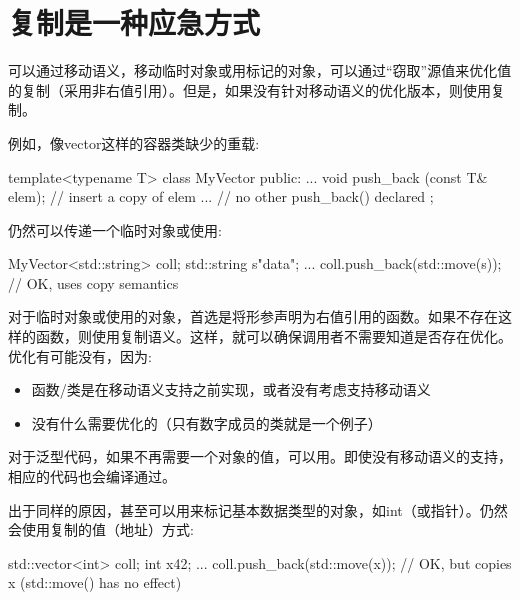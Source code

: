 \section{复制是一种应急方式}
可以通过移动语义，移动临时对象或用标记的对象，可以通过“窃取”源值来优化值的复制（采用非右值引用）。但是，如果没有针对移动语义的优化版本，则使用复制。

例如，像vector这样的容器类缺少的重载:

\begin{cppcode}
template<typename T>
class MyVector {
	public:
	...
	void push_back (const T& elem); // insert a copy of elem
	... // no other push_back() declared
};
\end{cppcode}

仍然可以传递一个临时对象或使用:

\begin{cppcode}
MyVector<std::string> coll;
std::string s{"data"};
...
coll.push_back(std::move(s)); // OK, uses copy semantics
\end{cppcode}

对于临时对象或使用的对象，首选是将形参声明为右值引用的函数。如果不存在这样的函数，则使用复制语义。这样，就可以确保调用者不需要知道是否存在优化。优化有可能没有，因为:


\begin{itemize}
	\item 函数/类是在移动语义支持之前实现，或者没有考虑支持移动语义
	\item 没有什么需要优化的（只有数字成员的类就是一个例子）
\end{itemize}

对于泛型代码，如果不再需要一个对象的值，可以用。即使没有移动语义的支持，相应的代码也会编译通过。


出于同样的原因，甚至可以用来标记基本数据类型的对象，如int（或指针）。仍然会使用复制的值（地址）方式:


\begin{cppcode}
std::vector<int> coll;
int x{42};
...
coll.push_back(std::move(x)); // OK, but copies x (std::move() has no effect)
\end{cppcode}


	